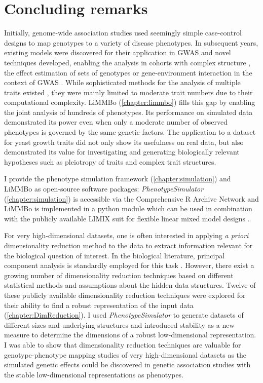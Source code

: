 \chapter{Concluding remarks}
Initially, genome-wide association studies used seemingly simple case-control designs to map genotypes to a variety of disease phenotypes. In subsequent years, existing models were discovered for their application in GWAS \citep{Korte2012} and novel techniques developed, enabling the analysis in cohorts with complex structure \citep{Yu2006,Kang2010}, the effect estimation of sets of genotypes \citep{Wu2010,Casale2015} or gene-environment interaction in the context of GWAS \citep{Casale2017}. While sophisticated methods for the analysis of multiple traits existed \citep{Korte2012,Zhou2012,Casale2015}, they were mainly limited to moderate trait numbers due to their computational complexity. LiMMBo (\cref{chapter:limmbo}) fills this gap by enabling the joint analysis of hundreds of phenotypes.  Its performance on simulated data demonstrated its power even when only a moderate number of observed phenotypes is governed by the same genetic factors. The application to a dataset for yeast growth traits did not only show its usefulness on real data, but also demonstrated its value for investigating and generating biologically relevant hypotheses such as pleiotropy of traits and complex trait structures. 

I provide the phenotype simulation framework (\cref{chapter:simulation}) and LiMMBo as open-source software packages: \textit{PhenotypeSimulator} (\cref{chapter:simulation}) is accessible via the Comprehensive R Archive Network \citep{Meyer2017b} and LiMMBo is implemented in a python module which can be used in combination with the publicly available LIMIX suit for flexible linear mixed model designs \citep{Lippert2014}.

For very high-dimensional datasets, one is often interested in applying \textit{a priori} dimensionality reduction method to the data to extract information relevant for the biological question of interest. In the biological literature, principal component analysis is standardly employed for this task \citep{Avery2011,Liu2012,Zhang2012}. However, there exist a growing number of dimensionality reduction techniques based on different statistical methods and assumptions about the hidden data structures. Twelve of these publicly available dimensionality reduction techniques were explored for their ability to find a robust representation of the input data (\cref{chapter:DimReduction}). I used \textit{PhenotypeSimulator} to generate datasets of different sizes and underlying structures and introduced stability as a new measure to determine the dimensions of a robust low-dimensional representation. I was able to show that dimensionality reduction techniques are valuable for genotype-phenotype mapping studies of very high-dimensional datasets as the simulated genetic effects could be discovered in genetic association studies with the stable low-dimensional representations as phenotypes.

